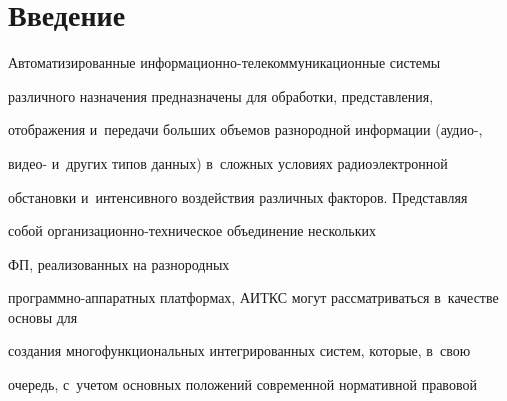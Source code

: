 












      \thispagestyle{headings}

      


     

     \vspace*{-20pt}



\section{Введение}



\vspace*{-4pt}



     Автоматизированные информационно-телекоммуникационные системы 

различного назначения предназначены для обработки, представления, 

отображения и~передачи больших объемов разнородной информации (аудио-, 

ви\-део- и~других типов данных) в~сложных условиях радиоэлектронной 

обстановки и~интенсивного воздействия различных факторов. Представляя 

собой ор\-га\-ни\-за\-ци\-он\-но-тех\-ни\-че\-ское объединение нескольких 

ФП, реализованных на разнородных 

про\-граммно-ап\-па\-рат\-ных платформах, АИТКС могут рассматриваться в~качестве основы для 

создания многофункциональных интегрированных систем, которые, в~свою 

очередь, с~учетом основных положений современной нормативной правовой 

